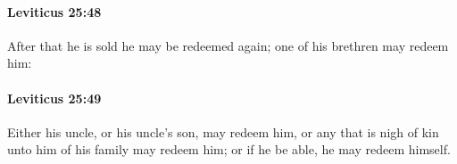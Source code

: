 		\paragraph{Leviticus 25:48} %
			\label{LEVITICUS-25-48}

			After that he is sold he may be redeemed again; one of his brethren may redeem him:


		\paragraph{Leviticus 25:49} %
			\label{LEVITICUS-25-49}

			Either his uncle, or his uncle’s son, may redeem him, or any that is nigh of kin unto him of his family may redeem him; or if he be able, he may redeem himself.


